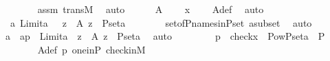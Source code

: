 \begin{isabellebody}
\ \ \ \ \ \ \isamarkupfalse%
\ assm\ transM\ \isamarkupfalse%
\ auto\isanewline
\ \ \ \ \isamarkupfalse%
\ {\isachardoublequoteopen}A\ {\isasymnoteq}\ {}{\isachardoublequoteclose}\ \isamarkupfalse%
\ {\isacartoucheopen}x\ {\isasymnoteq}\ {}{\isacartoucheclose}\ \isamarkupfalse%
\ A{\isacharunderscore}{\kern0pt}def\ \isamarkupfalse%
\ auto\ \isanewline
\ \ \ \ \isamarkupfalse%
\ \isamarkupfalse%
\ {\isachardoublequoteopen}{\isasymexists}\ a{\isachardot}{\kern0pt}\ {\isacharparenleft}{\kern0pt}Limit{\isacharparenleft}{\kern0pt}a{\isacharparenright}{\kern0pt}\ {\isasymand}\ {\isacharparenleft}{\kern0pt}{\isasymforall}\ z\ {\isasymin}\ A{\isachardot}{\kern0pt}\ z\ {\isasymin}\ P{\isacharunderscore}{\kern0pt}set{\isacharparenleft}{\kern0pt}a{\isacharparenright}{\kern0pt}{\isacharparenright}{\kern0pt}{\isacharparenright}{\kern0pt}{\isachardoublequoteclose}\isanewline
\ \ \ \ \ \ \isamarkupfalse%
\ set{\isacharunderscore}{\kern0pt}of{\isacharunderscore}{\kern0pt}P{\isacharunderscore}{\kern0pt}names{\isacharunderscore}{\kern0pt}in{\isacharunderscore}{\kern0pt}P{\isacharunderscore}{\kern0pt}set\ asubset\ \isamarkupfalse%
\ auto\isanewline
\ \ \ \ \isamarkupfalse%
\ \isamarkupfalse%
\ a\ \ ap\ {\isacharcolon}{\kern0pt}\ {\isachardoublequoteopen}Limit{\isacharparenleft}{\kern0pt}a{\isacharparenright}{\kern0pt}{\isachardoublequoteclose}\ {\isachardoublequoteopen}{\isacharparenleft}{\kern0pt}{\isasymforall}\ z\ {\isasymin}\ A{\isachardot}{\kern0pt}\ z\ {\isasymin}\ P{\isacharunderscore}{\kern0pt}set{\isacharparenleft}{\kern0pt}a{\isacharparenright}{\kern0pt}{\isacharparenright}{\kern0pt}{\isachardoublequoteclose}\ \isamarkupfalse%
\ auto\ \isanewline
\ \ \ \ \isamarkupfalse%
\ \isamarkupfalse%
\ p{}{\isacharcolon}{\kern0pt}\ \ {\isachardoublequoteopen}check{\isacharparenleft}{\kern0pt}x{\isacharparenright}{\kern0pt}\ {\isasymin}\ Pow{\isacharparenleft}{\kern0pt}P{\isacharunderscore}{\kern0pt}set{\isacharparenleft}{\kern0pt}a{\isacharparenright}{\kern0pt}\ {\isasymtimes}\ P{\isacharparenright}{\kern0pt}{\isachardoublequoteclose}\ \isanewline
\ \ \ \ \ \ \isamarkupfalse%
\ A{\isacharunderscore}{\kern0pt}def\ p{}\ one{\isacharunderscore}{\kern0pt}in{\isacharunderscore}{\kern0pt}P\ check{\isacharunderscore}{\kern0pt}in{\isacharunderscore}{\kern0pt}M\ \isamarkupfalse%

\end{isabellebody}
